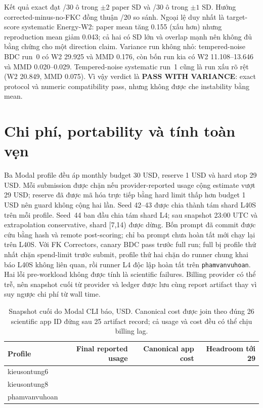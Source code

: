 \documentclass[11pt,a4paper]{article}
\newcommand{\code}[1]{\texttt{#1}}
\newcommand{\PWV}{\textcolor{blue!60!black}{\textbf{PASS WITH VARIANCE}}}
\begin{document}
Kết quả exact đạt \FKCWithinTwoSD/30 ô trong $\pm2$ paper SD và \FKCWithinOneSD/30 ô trong $\pm1$ SD. Hướng corrected-minus-no-FKC đồng thuận \FKCDirectionAgreement/20 so sánh. Ngoại lệ duy nhất là target-score systematic Energy-W2: paper mean tăng 0.155 (xấu hơn) nhưng reproduction mean giảm 0.043; cả hai có SD lớn và overlap mạnh nên không đủ bằng chứng cho một direction claim. Variance run không nhỏ: tempered-noise BDC run~0 có W2 29.925 và MMD 0.176, còn bốn run kia có W2 11.108--13.646 và MMD 0.020--0.029. Tempered-noise systematic run~1 cũng là run xấu rõ rệt (W2 20.849, MMD 0.075). Vì vậy verdict là \PWV: exact protocol và numeric compatibility pass, nhưng không được che instability bằng mean.

\section{Chi phí, portability và tính toàn vẹn}

Ba Modal profile đều áp monthly budget 30 USD, reserve 1 USD và hard stop 29 USD. Mỗi submission được chặn nếu provider-reported usage cộng estimate vượt 29 USD; reserve đã được mã hóa trực tiếp bằng hard limit thấp hơn budget 1 USD nên guard không cộng hai lần. Seed 42--43 được chia thành tám shard L40S trên mỗi profile. Seed~44 ban đầu chia tám shard L4; sau snapshot 23:00 UTC và extrapolation conservative, shard [7,14) được dừng. Bốn prompt đã commit được cứu bằng hash và remote post-scoring; chỉ ba prompt chưa hoàn tất mới chạy lại trên L40S. Với FK Correctors, canary BDC pass trước full run; full bị profile thứ nhất chặn spend-limit trước submit, profile thứ hai chặn do runner chung khai báo L40S không liên quan, rồi runner L4 độc lập hoàn tất trên \code{phamvanvuhoan}. Hai lỗi pre-workload không được tính là scientific failures. Billing provider có thể trễ, nên snapshot cuối từ provider và ledger được lưu cùng report artifact thay vì suy ngược chi phí từ wall time.

\begin{table}[H]
\centering
\small
\caption{Snapshot cuối do Modal CLI báo, USD. Canonical cost được join theo đúng 26 scientific app ID đứng sau 25 artifact record; cả usage và cost đều có thể chịu billing lag.}
\begin{tabular}{@{}lrrr@{}}
\toprule
Profile & Final reported usage & Canonical app cost & Headroom tới 29 \\
\midrule
kieusontung6 & \BillingTungSixUsage{} & \BillingTungSixCost{} & \BillingTungSixHeadroom{} \\
kieusontung8 & \BillingTungEightUsage{} & \BillingTungEightCost{} & \BillingTungEightHeadroom{} \\
phamvanvuhoan & \BillingVuHoanUsage{} & \BillingVuHoanCost{} & \BillingVuHoanHeadroom{} \\
\bottomrule
\end{tabular}
\end{table}
\end{document}
